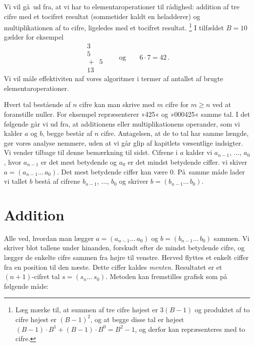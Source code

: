 Vi vil gå ud fra, at vi har to elementaroperationer til rådighed:
addition af tre cifre med et tocifret resultat (sommetider kaldt en heladderer)
og multiplikationen af to cifre, ligeledes med et tocifret resultat.%
\footnote{Læg mærke til, at summen af tre cifre højest er $3(B - 1)$ og produktet af to cifre højest er $(B-1)^2$, og at begge disse tal er højest $(B-1)\cdot B^1 + (B - 1)\cdot B^0 = B^2 - 1$, og derfor kan repræsenteres med to cifre.}
I tilfældet $B=10$ gælder for eksempel
\[  \begin{array}{r} 3 \\ 5 \\ {}+{}\;\;5 \\ \hline 13 \end{array}
\qquad\text{og}\qquad    6 \cdot 7 = 42 \,. \]
Vi vil måle effektiviten naf vores algoritmer i termer af antallet af brugte elementaroperationer.

Hvert tal bestående af $n$ cifre kan man skrive med $m$ cifre for $m \ge n$ ved at foranstille nuller.
For eksempel repræsenterer »425« og »000425« samme tal. 
I det følgende går vi ud fra, at additionens eller multiplikationens operander, som vi kalder $a$ og $b$, begge består af $n$ cifre.
Antagelsen, at de to tal har samme længde, gør vores analyse nemmere, uden at vi går glip af kapitlets væsentlige indsigter.
Vi vender tilbage til denne bemærkning til sidst.
Cifrene i $a$ kalder vi $a_{n-1}$, $\ldots$, $a_0$, hvor $a_{n-1}$ er det mest betydende og $a_0$  er det mindst betydende ciffer.
vi skiver $a = (a_{n-1}\ldots\,a_0)$.  
Det mest betydende ciffer kan være 0.
På samme måde lader vi tallet $b$ bestå af cifrene $b_{n-1}$, $\ldots$, $b_0$ og skriver $b =(b_{n-1}\ldots\,b_0)$.


\section{Addition}

Alle ved, hvordan man lægger
$a = (a_{n-1}\ldots\,a_0)$ og $b = (b_{n-1}\ldots\,b_0)$ sammen.
Vi skriver blot tallene under hinanden, forskudt efter de mindst betydende cifre, og lægger de enkelte cifre sammen fra højre til venstre.
Herved flyttes et enkelt ciffer fra en position til den næste.
Dette ciffer kaldes \emph{menten}. 
Resultatet er et $(n+1)$-cifret tal $s=(s_n\ldots\,s_0)$.
Metoden kan fremstilles grafisk som på følgende måde:

